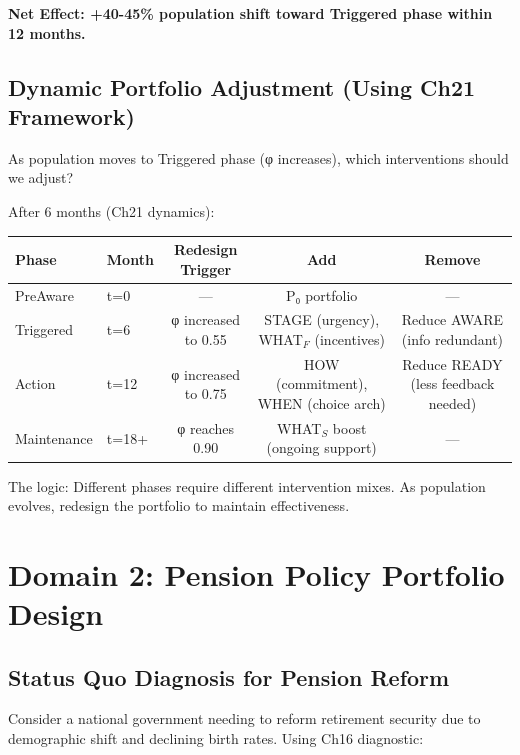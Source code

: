\textbf{Net Effect: +40-45\% population shift toward Triggered phase within 12 months.}

\subsection{Dynamic Portfolio Adjustment (Using Ch21 Framework)}

As population moves to Triggered phase (φ increases), which interventions should we adjust?

After 6 months (Ch21 dynamics):

\begin{center}
\begin{tabular}{@{}llccc@{}}
\toprule
\textbf{Phase} & \textbf{Month} & \textbf{Redesign Trigger} & \textbf{Add} & \textbf{Remove} \\
\midrule
PreAware & t=0 & --- & P₀ portfolio & --- \\
Triggered & t=6 & φ increased to 0.55 & STAGE (urgency), WHAT$_F$ (incentives) & Reduce AWARE (info redundant) \\
Action & t=12 & φ increased to 0.75 & HOW (commitment), WHEN (choice arch) & Reduce READY (less feedback needed) \\
Maintenance & t=18+ & φ reaches 0.90 & WHAT$_S$ boost (ongoing support) & --- \\
\midrule
\end{tabular}
\end{center}

The logic: Different phases require different intervention mixes. As population evolves, redesign the portfolio to maintain effectiveness.


\section{Domain 2: Pension Policy Portfolio Design}
\label{sec:pension-portfolio}

\subsection{Status Quo Diagnosis for Pension Reform}

Consider a national government needing to reform retirement security due to demographic shift and declining birth rates. Using Ch16 diagnostic:

